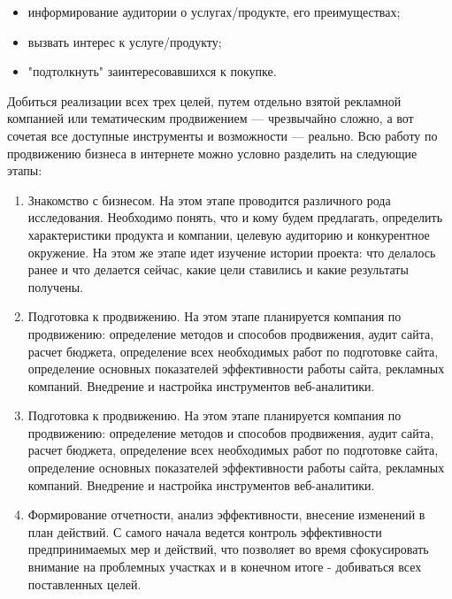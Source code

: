 \documentclass[a4paper,english,russian]{G2-105}
\begin{document}
\begin{itemize}
\item информирование аудитории о услугах/продукте, его преимуществах;
\item вызвать интерес к услуге/продукту;
\item "подтолкнуть" заинтересовавшихся к покупке.
\end{itemize}
\par Добиться реализации всех трех целей, путем отдельно взятой рекламной компанией или тематическим продвижением --- чрезвычайно сложно, а вот сочетая все доступные инструменты и возможности --- реально. Всю работу по продвижению бизнеса в интернете можно условно разделить на следующие этапы:
\begin{enumerate}
\item Знакомство с бизнесом. На этом этапе проводится различного рода исследования. Необходимо понять, что и кому будем предлагать, определить характеристики продукта и компании, целевую аудиторию и конкурентное окружение. На этом же этапе идет изучение истории проекта: что делалось ранее и что делается сейчас, какие цели ставились и какие результаты получены.
\item Подготовка к продвижению. На этом этапе планируется компания по продвижению: определение методов и способов продвижения, аудит сайта, расчет бюджета, определение всех необходимых работ по подготовке сайта, определение основных показателей эффективности работы сайта, рекламных компаний. Внедрение и настройка инструментов веб-аналитики.
\item Подготовка к продвижению. На этом этапе планируется компания по продвижению: определение методов и способов продвижения, аудит сайта, расчет бюджета, определение всех необходимых работ по подготовке сайта, определение основных показателей эффективности работы сайта, рекламных компаний. Внедрение и настройка инструментов веб-аналитики.
\item Формирование отчетности, анализ эффективности, внесение изменений в план действий. С самого начала ведется контроль эффективности предпринимаемых мер и действий, что позволяет во время сфокусировать внимание на проблемных участках и в конечном итоге - добиваться всех поставленных целей.
\end{enumerate}
\end{document}
